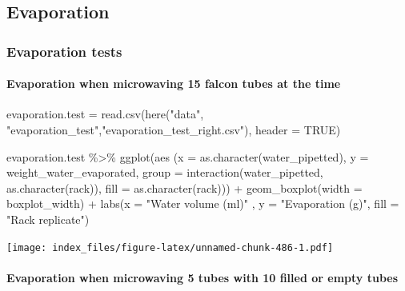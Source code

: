 \documentclass[
]{article}
\newenvironment{Shaded}{\begin{snugshade}}{\end{snugshade}}
\newcommand{\AttributeTok}[1]{\textcolor[rgb]{0.77,0.63,0.00}{#1}}
\newcommand{\ConstantTok}[1]{\textcolor[rgb]{0.00,0.00,0.00}{#1}}
\newcommand{\FunctionTok}[1]{\textcolor[rgb]{0.00,0.00,0.00}{#1}}
\newcommand{\NormalTok}[1]{#1}
\newcommand{\OtherTok}[1]{\textcolor[rgb]{0.56,0.35,0.01}{#1}}
\newcommand{\SpecialCharTok}[1]{\textcolor[rgb]{0.00,0.00,0.00}{#1}}
\newcommand{\StringTok}[1]{\textcolor[rgb]{0.31,0.60,0.02}{#1}}
\begin{document}
\hypertarget{evaporation}{%
\subsection{Evaporation}\label{evaporation}}

\hypertarget{evaporation-tests}{%
\subsubsection{Evaporation tests}\label{evaporation-tests}}

\hypertarget{evaporation-when-microwaving-15-falcon-tubes-at-the-time}{%
\paragraph{Evaporation when microwaving 15 falcon tubes at the
time}\label{evaporation-when-microwaving-15-falcon-tubes-at-the-time}}

\begin{Shaded}
\begin{Highlighting}[]
\NormalTok{evaporation.test }\OtherTok{=} \FunctionTok{read.csv}\NormalTok{(}\FunctionTok{here}\NormalTok{(}\StringTok{"data"}\NormalTok{, }\StringTok{"evaporation\_test"}\NormalTok{,}\StringTok{"evaporation\_test\_right.csv"}\NormalTok{), }\AttributeTok{header =} \ConstantTok{TRUE}\NormalTok{)}

\NormalTok{evaporation.test }\SpecialCharTok{\%\textgreater{}\%}
  \FunctionTok{ggplot}\NormalTok{(}\FunctionTok{aes}\NormalTok{ (}\AttributeTok{x =} \FunctionTok{as.character}\NormalTok{(water\_pipetted),}
                \AttributeTok{y =}\NormalTok{ weight\_water\_evaporated,}
                \AttributeTok{group =} \FunctionTok{interaction}\NormalTok{(water\_pipetted, }\FunctionTok{as.character}\NormalTok{(rack)),}
                \AttributeTok{fill =} \FunctionTok{as.character}\NormalTok{(rack))) }\SpecialCharTok{+}
  \FunctionTok{geom\_boxplot}\NormalTok{(}\AttributeTok{width =}\NormalTok{ boxplot\_width) }\SpecialCharTok{+}
  \FunctionTok{labs}\NormalTok{(}\AttributeTok{x =} \StringTok{"Water volume (ml)"}\NormalTok{ , }
       \AttributeTok{y =} \StringTok{"Evaporation (g)"}\NormalTok{, }
       \AttributeTok{fill =} \StringTok{"Rack replicate"}\NormalTok{)}
\end{Highlighting}
\end{Shaded}

\texttt{[image: index\_files/figure-latex/unnamed-chunk-486-1.pdf]}

\hypertarget{evaporation-when-microwaving-5-tubes-with-10-filled-or-empty-tubes}{%
\paragraph{Evaporation when microwaving 5 tubes with 10 filled or empty
tubes}\label{evaporation-when-microwaving-5-tubes-with-10-filled-or-empty-tubes}}
\end{document}
